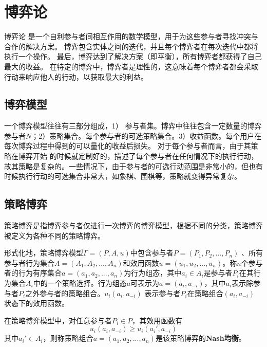 
\section{博弈论}
博弈论\cite{owen2001game,gibbons1992game} 是一个自利参与者间相互作用的数学模型，用于为这些参与者寻找冲突与合作的解决方案。 博弈包含实体之间的迭代，并且每个博弈者在每次迭代中都将执行一个操作。 最后，博弈达到了解决方案（即平衡），所有博弈者都获得了自己最大的收益。 在特定的博弈中，博弈者是理性的，这意味着每个博弈者都会采取行动来响应他人的行动，以获取最大的利益。


\subsection{博弈模型}

一个博弈模型往往有三部分组成，1） 参与者集。博弈中往往包含一定数量的博弈参与者$N$；2）策略集合。每个参与者的可选策略集合。3）收益函数。每个用户在每次博弈过程中得到的可以量化的收益后损失。
对于每个参与者而言，由于其策略在博弈开始 的时候就定制好的，描述了每个参与者在任何情况下的执行行动，故其策略是复杂的。一些情况下，由于参与者的可选行动范围是非常小的，但也有时候执行行动的可选集合非常大，如象棋、围棋等，策略就变得异常复杂。

\subsection{策略博弈}
策略博弈是指博弈参与者仅进行一次博弈的博弈模型，根据不同的分类，策略博弈被定义为各种不同的策略博弈。

形式化地，策略博弈模型$\Gamma=(P,A,u)$中包含参与者$P=(P_1,P_2,...,P_n)$   、所有参与者行为集合$A=(A_1,A_2,...,A_n)$和效用函数$u=(u_1,u_2,...,u_n)$。称$n$个参与者的行为有序集合$a=(a_1,a_2,...,a_n)$为行为组态，其中$a_i \in A_i$是参与者$P_i$在其行为集合$A_i$中的一个策略选择。行为组态$a$可表示为$a=(a_i,a_{-i})$，其中$a_i$表示除参与者$P_i$之外参与者的策略组合。$u_i(a_i,a_{-i})$ 表示参与者$P_i$在策略组合$(a_i,a_{-i})$ 状态下的效用函数。

\begin{definition}
	在策略博弈模型中，对任意参与者$P_i \in P$，其效用函数有
	\begin{equation}
	u_i(a_i,a_{-i}) \geq 	u_i(a_i',a_{-i})
	\end{equation}
	其中$a_i'\in A_i$，则称策略组合$a=(a_1,a_2,...,a_n)$是该策略博弈的\textbf{Nash均衡}。
\end{definition}


